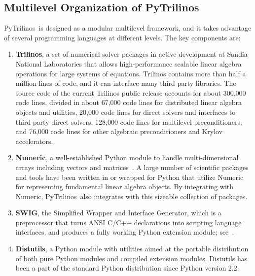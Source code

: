 \documentclass[acmtocl]{acmtrans2m}
\newcommand{\PyTrilinos}{{PyTrilinos}}
\begin{document}
\subsection{Multilevel Organization of \PyTrilinos}
\label{sec:multilevel}

\PyTrilinos\ is designed as a modular multilevel framework, and it
takes advantage of several programming languages at different levels.
The key components are:

\begin{enumerate}

\item {\bf Trilinos}, a set of numerical solver packages in active
  development at Sandia National Laboratories that allows
  high-performance scalable linear algebra operations for large
  systems of equations.  Trilinos contains more than half a million
  lines of code, and it can interface many third-party libraries.  The
  source code of the current Trilinos public release accounts for
  about 300,000 code lines, divided in about 67,000 code lines for
  distributed linear algebra objects and utilities, 20,000 code lines
  for direct solvers and interfaces to third-party direct solvers,
  128,000 code lines for multilevel preconditioners, and 76,000 code
  lines for other algebraic preconditioners and Krylov accelerators.

\item {\bf Numeric}, a well-established Python module to handle
  multi-dimensional arrays including vectors and
  matrices~\cite{numeric}.  A large number of scientific packages and
  tools have been written in or wrapped for Python that utilize
  Numeric for representing fundamental linear algebra objects.  By
  integrating with Numeric, \PyTrilinos\ also integrates with this
  sizeable collection of packages.

\item {\bf SWIG}, the Simplified Wrapper and Interface Generator,
  which is a preprocessor that turns ANSI C/C++ declarations into
  scripting language interfaces, and produces a fully working Python
  extension module; see~\cite{swig}.

\item {\bf Distutils}, a Python module with utilities aimed at the
  portable distribution of both pure Python modules and compiled
  extension modules.  Distutils has been a part of the standard Python
  distribution since Python version 2.2.

\end{enumerate}
\end{document}
